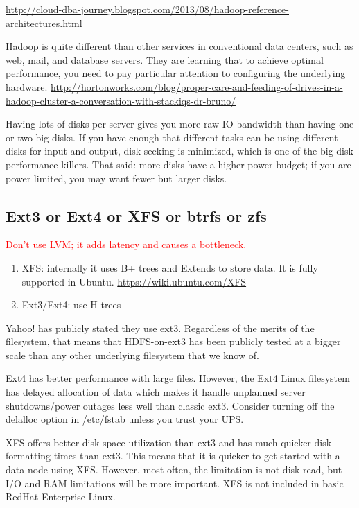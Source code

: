 \url{http://cloud-dba-journey.blogspot.com/2013/08/hadoop-reference-architectures.html}

Hadoop is quite different than other services in conventional data centers, such
as web, mail, and database servers. They are learning that to achieve optimal
performance, you need to pay particular attention to configuring the underlying
hardware.
\url{http://hortonworks.com/blog/proper-care-and-feeding-of-drives-in-a-hadoop-cluster-a-conversation-with-stackiqs-dr-bruno/}

Having lots of disks per server gives you more raw IO bandwidth than having one
or two big disks. If you have enough that different tasks can be using different
disks for input and output, disk seeking is minimized, which is one of the big
disk performance killers. That said: more disks have a higher power budget; if
you are power limited, you may want fewer but larger disks.    

\subsection{Ext3 or Ext4 or XFS or btrfs or zfs}

\textcolor{red}{Don't use LVM; it adds latency and causes a bottleneck.}  

\begin{enumerate}
  \item XFS: internally it uses B+ trees and Extends to store data. It is fully
  supported in Ubuntu. \url{https://wiki.ubuntu.com/XFS}
  \item Ext3/Ext4: use H trees
\end{enumerate}

Yahoo! has publicly stated they use ext3. Regardless of the merits of the
filesystem, that means that HDFS-on-ext3 has been publicly tested at a bigger
scale than any other underlying filesystem that we know of.


Ext4 has better performance with large files. However, the Ext4 Linux filesystem
has delayed allocation of data which makes it handle unplanned server
shutdowns/power outages less well than classic ext3. Consider turning off the
delalloc option in /etc/fstab unless you trust your UPS.

XFS offers better disk space utilization than ext3 and has much quicker disk
formatting times than ext3. This means that it is quicker to get started with a
data node using XFS. However, most often, the limitation is not disk-read, but 
I/O and RAM limitations will be more important. XFS is not included in basic
RedHat Enterprise Linux.


